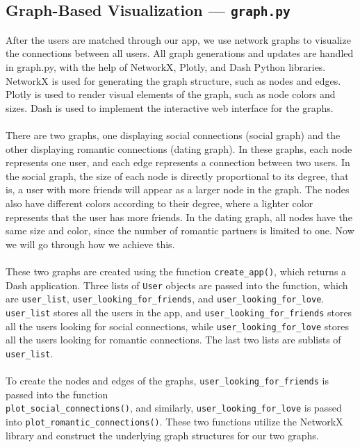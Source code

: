\documentclass[fontsize=11pt]{article}
\begin{document}
\subsection*{Graph-Based Visualization --- \texttt{graph.py}}
After the users are matched through our app, we use network graphs to visualize the connections between all users.
All graph generations and updates are handled in graph.py, with the help of NetworkX, Plotly, and Dash Python libraries.
NetworkX is used for generating the graph structure, such as nodes and edges.
Plotly is used to render visual elements of the graph, such as node colors and sizes. Dash is used to implement the interactive web interface for the graphs.
\\
\\
There are two graphs, one displaying social connections (social graph) and the other displaying romantic connections (dating graph).
In these graphs, each node represents one user, and each edge represents a connection between two users.
In the social graph, the size of each node is directly proportional to its degree, that is, a user with more friends will appear as a larger node in the graph.
The nodes also have different colors according to their degree, where a lighter color represents that the user has more friends. In the dating graph, all nodes have the same size and color, since the number of romantic partners is limited to one.
Now we will go through how we achieve this.
\\
\\
These two graphs are created using the function \texttt{create\_app()}, which returns a Dash application.
Three lists of \texttt{User} objects are passed into the function, which are \texttt{user\_list}, \texttt{user\_looking\_for\_friends}, and \texttt{user\_looking\_for\_love}. \texttt{user\_list} stores all the users in the app, and \texttt{user\_looking\_for\_friends} stores all the users looking for social connections, while \texttt{user\_looking\_for\_love} stores all the users looking for romantic connections.
The last two lists are sublists of \texttt{user\_list}.
\\
\\
To create the nodes and edges of the graphs, \texttt{user\_looking\_for\_friends} is passed into the function
\\
\texttt{plot\_social\_connections()}, and similarly, \texttt{user\_looking\_for\_love} is passed into \texttt{plot\_romantic\_connections()}.
These two functions utilize the NetworkX library and construct the underlying graph structures for our two graphs.
\end{document}
